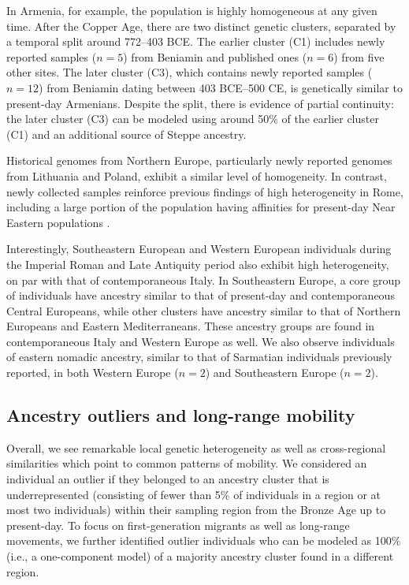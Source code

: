 \documentclass[11pt]{article}
\begin{document}
In Armenia, for example, the population is highly homogeneous at any given time. After the Copper Age, there are two distinct genetic clusters, separated by a temporal split around 772--403 BCE. The earlier cluster (C1) includes newly reported samples ($n = 5$) from Beniamin and published ones ($n = 6$) from five other sites. The later cluster (C3), which contains newly reported samples ($n = 12$) from Beniamin dating between 403 BCE--500 CE, is genetically similar to present-day Armenians. Despite the split, there is evidence of partial continuity: the later cluster (C3) can be modeled using around 50\% of the earlier cluster (C1) and an additional source of Steppe ancestry.

Historical genomes from Northern Europe, particularly newly reported genomes from Lithuania and Poland, exhibit a similar level of homogeneity. In contrast, newly collected samples reinforce previous findings of high heterogeneity in Rome, including a large portion of the population having affinities for present-day Near Eastern populations \citep{antonio2019, posth2021}.

Interestingly, Southeastern European and Western European individuals during the Imperial Roman and Late Antiquity period also exhibit high heterogeneity, on par with that of contemporaneous Italy. In Southeastern Europe, a core group of individuals have ancestry similar to that of present-day and contemporaneous Central Europeans, while other clusters have ancestry similar to that of Northern Europeans and Eastern Mediterraneans. These ancestry groups are found in contemporaneous Italy and Western Europe as well. We also observe individuals of eastern nomadic ancestry, similar to that of Sarmatian individuals previously reported, in both Western Europe ($n = 2$) and Southeastern Europe ($n = 2$).

\subsection{Ancestry outliers and long-range mobility}

Overall, we see remarkable local genetic heterogeneity as well as cross-regional similarities which point to common patterns of mobility. We considered an individual an outlier if they belonged to an ancestry cluster that is underrepresented (consisting of fewer than 5\% of individuals in a region or at most two individuals) within their sampling region from the Bronze Age up to present-day. To focus on first-generation migrants as well as long-range movements, we further identified outlier individuals who can be modeled as 100\% (i.e., a one-component model) of a majority ancestry cluster found in a different region.
\end{document}
